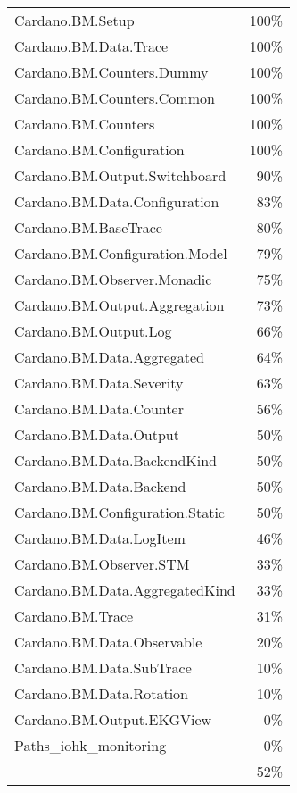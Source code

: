 \begin{tabular}{l r}
   Cardano.BM.Setup & 100\% \\
   Cardano.BM.Data.Trace & 100\% \\
   Cardano.BM.Counters.Dummy & 100\% \\
   Cardano.BM.Counters.Common & 100\% \\
   Cardano.BM.Counters & 100\% \\
   Cardano.BM.Configuration & 100\% \\
   Cardano.BM.Output.Switchboard & 90\% \\
   Cardano.BM.Data.Configuration & 83\% \\
   Cardano.BM.BaseTrace & 80\% \\
   Cardano.BM.Configuration.Model & 79\% \\
   Cardano.BM.Observer.Monadic & 75\% \\
   Cardano.BM.Output.Aggregation & 73\% \\
   Cardano.BM.Output.Log & 66\% \\
   Cardano.BM.Data.Aggregated & 64\% \\
   Cardano.BM.Data.Severity & 63\% \\
   Cardano.BM.Data.Counter & 56\% \\
   Cardano.BM.Data.Output & 50\% \\
   Cardano.BM.Data.BackendKind & 50\% \\
   Cardano.BM.Data.Backend & 50\% \\
   Cardano.BM.Configuration.Static & 50\% \\
   Cardano.BM.Data.LogItem & 46\% \\
   Cardano.BM.Observer.STM & 33\% \\
   Cardano.BM.Data.AggregatedKind & 33\% \\
   Cardano.BM.Trace & 31\% \\
   Cardano.BM.Data.Observable & 20\% \\
   Cardano.BM.Data.SubTrace & 10\% \\
   Cardano.BM.Data.Rotation & 10\% \\
   Cardano.BM.Output.EKGView & 0\% \\
   Paths\_iohk\_monitoring & 0\% \\
    & 52\% \\
\end{tabular}
